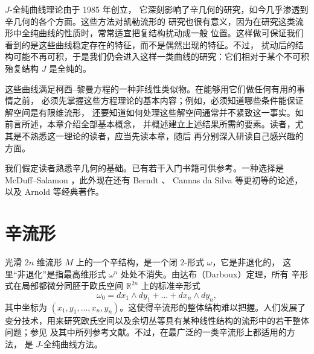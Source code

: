 
$J$-全纯曲线理论由于 1985 年创立，
它深刻影响了辛几何的研究，如今几乎渗透到辛几何的各个方面。这些方法对凯勒流形的
研究也很有意义，因为在研究这类流形中全纯曲线的性质时，常常适宜把复结构扰动成一般
位置。这样做可保证我们看到的是这些曲线稳定存在的特征，而不是偶然出现的特征。不过，
扰动后的结构可能不再可积，于是我们仍会进入这样一类曲线的研究：它们相对于某个不可积
殆复结构 $J$ 是全纯的。

这些曲线满足柯西--黎曼方程的一种非线性类似物。在能够用它们做任何有用的事情之前，
必须先掌握这些方程理论的基本内容；例如，必须知道哪些条件能保证解空间是有限维流形，
还要知道如何处理这些解空间通常并不紧致这一事实。如前言所述，本章介绍全部基本概念，
并概述建立上述结果所需的要素。读者，尤其是不熟悉这一理论的读者，应当先读本章，随后
再分别深入研读自己感兴趣的方面。

我们假定读者熟悉辛几何的基础。已有若干入门书籍可供参考。一种选择是
McDuff--Salamon ，此外现在还有 Berndt 、
Cannas da Silva  等更初等的论述，以及 Arnold  等经典著作。

\section{辛流形}\label{sec:1-1}

光滑 $2n$ 维流形 $M$ 上的一个辛结构，是一个闭 $2$-形式 $\omega$，它是非退化的，
这里“非退化”是指最高维形式 $\omega^n$ 处处不消失。由达布（Darboux）定理，所有
辛形式在局部都微分同胚于欧氏空间 $\mathbb R^{2n}$ 上的标准辛形式
\[
  \omega_0=dx_1\wedge dy_1+\dots+dx_n\wedge dy_n,
\]
其中坐标为 $(x_1,y_1,\dots,x_n,y_n)$。这使得辛流形的整体结构难以把握。人们发展了
变分技术，用来研究欧氏空间以及余切丛等具有某种线性结构的流形中的若干整体问题；参见
 及其中所列参考文献。不过，在最广泛的一类辛流形上都适用的方法，
是 $J$-全纯曲线方法。

